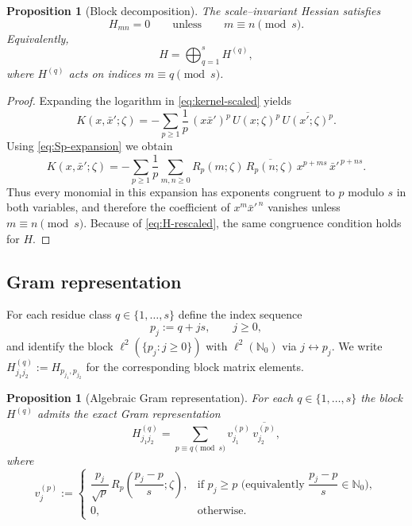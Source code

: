 \documentclass[11pt]{amsart}
\numberwithin{equation}{section}
\theoremstyle{plain}
\newtheorem{proposition}[theorem]{Proposition}
\theoremstyle{definition}
\theoremstyle{remark}
\newcommand{\N}{\mathbb{N}}
\begin{document}
\begin{proposition}[Block decomposition]\label{prop:block-decomposition-scale}
	The scale--invariant Hessian satisfies
	\[
		H_{mn}=0
		\qquad\text{unless}\qquad
		m\equiv n\pmod{s}.
	\]
	Equivalently,
	\[
		H=\bigoplus_{q=1}^{s} H^{(q)},
	\]
	where $H^{(q)}$ acts on indices $m\equiv q\pmod{s}$.
\end{proposition}

\begin{proof}
Expanding the logarithm in \eqref{eq:kernel-scaled} yields
\[
		K(x,\bar x';\zeta)
		=
		-\sum_{p\ge1}\frac{1}{p}\,(x\bar x')^{p}\,U(x;\zeta)^p\,\overline{U(x';\zeta)^p}.
	\]
	Using \eqref{eq:Sp-expansion} we obtain
	\[
		K(x,\bar x';\zeta)
		=
		-\sum_{p\ge1}\frac{1}{p}
		\sum_{m,n\ge0}
		R_p(m;\zeta)\,\overline{R_p(n;\zeta)}\,
		x^{p+ms}\,\bar x'^{\,p+ns}.
	\]
	Thus every monomial in this expansion has exponents congruent to $p$ modulo $s$ in both variables,
	and therefore the coefficient of $x^m\bar x'^{\,n}$ vanishes unless $m\equiv n\pmod{s}$. Because of \eqref{eq:H-rescaled}, the same congruence condition holds for $H$.
\end{proof}


\subsection{Gram representation}

For each residue class $q\in\{1,\dots,s\}$ define the index sequence
\[
	p_j:=q+js,\qquad j\ge0,
\]
and identify the block $\ell^2(\{p_j:j\ge0\})$ with $\ell^2(\N_0)$ via $j\leftrightarrow p_j$.
We write $H^{(q)}_{j_1j_2}:=H_{p_{j_1},p_{j_2}}$ for the corresponding block matrix elements.

\begin{proposition}[Algebraic Gram representation]\label{prop:gram-scale}
	For each $q\in\{1,\dots,s\}$ the block $H^{(q)}$ admits the exact Gram representation
	\begin{equation}\label{eq:Gram-alg}
		H^{(q)}_{j_1 j_2}
		=
		\sum_{p\equiv q\!\!\!\!\pmod{s}}
		v^{(p)}_{j_1}\,\overline{v^{(p)}_{j_2}},
	\end{equation}
	where
	\begin{equation}\label{eq:Gram-alg-vectors}
		v^{(p)}_j
		:=
		\begin{cases}
			\dfrac{p_j}{\sqrt p}\,R_p\!\left(\dfrac{p_j-p}{s};\zeta\right),
			   & \text{if } p_j\ge p \text{ (equivalently } \dfrac{p_j-p}{s}\in\N_0), \\[1.2ex]
			0, & \text{otherwise.}
		\end{cases}
	\end{equation}
\end{proposition}
\end{document}
